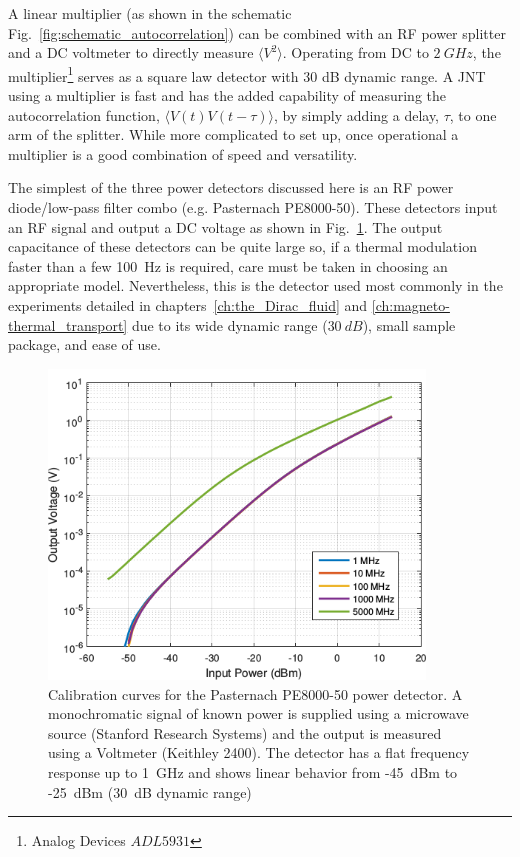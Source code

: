 A linear multiplier (as shown in the schematic Fig.~\ref{fig:schematic_autocorrelation}) can be combined with an RF power splitter and a DC voltmeter to directly measure $\langle V^2\rangle$. Operating from DC to $2~GHz$, the multiplier\footnote{Analog Devices $ADL5931$} serves as a square law detector with 30 dB dynamic range. A JNT using a multiplier is fast and has the added capability of measuring the autocorrelation function, $\langle V(t)V(t-\tau)\rangle$, by simply adding a delay, $\tau$, to one arm of the splitter. While more complicated to set up, once operational a multiplier is a good combination of speed and versatility.

The simplest of the three power detectors discussed here is an RF power diode/low-pass filter combo (e.g. Pasternach PE8000-50). These detectors input an RF signal and output a DC voltage as shown in Fig.~\ref{fig:PE8000}. The output capacitance of these detectors can be quite large so, if a thermal modulation faster than a few 100~Hz is required, care must be taken in choosing an appropriate model. Nevertheless, this is the detector used most commonly in the experiments detailed in chapters~\ref{ch:the_Dirac_fluid} and \ref{ch:magneto-thermal_transport} due to its wide dynamic range ($30~dB$), small sample package, and ease of use.

\begin{figure}
\centering
\includegraphics[width = 100mm]{figures/Johnson_noise_thermometry/PE8000-50.png}
\caption{Calibration curves for the Pasternach PE8000-50 power detector. A monochromatic signal of known power is supplied using a microwave source (Stanford Research Systems) and the output is measured using a Voltmeter (Keithley 2400). The detector has a flat frequency response up to 1~GHz and shows linear behavior from -45~dBm to -25~dBm (30~dB dynamic range)}
\label{fig:PE8000}
\end{figure}

